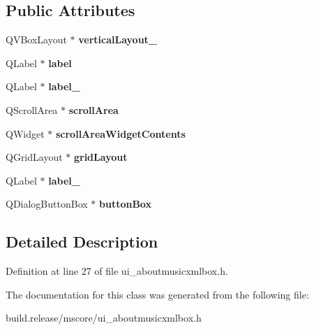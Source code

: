 \subsection*{Public Attributes}
\begin{DoxyCompactItemize}
\item 
\mbox{\label{class_ui___about_music_x_m_l_box_a650afe17b9766b7e45d92c96d412a197}} 
Q\+V\+Box\+Layout $\ast$ {\bfseries vertical\+Layout\+\_}
\item 
\mbox{\label{class_ui___about_music_x_m_l_box_a831104b85672b1934ec876605ca965ea}} 
Q\+Label $\ast$ {\bfseries label}
\item 
\mbox{\label{class_ui___about_music_x_m_l_box_ad11ce0ebb7d0b122afe2c965315f62eb}} 
Q\+Label $\ast$ {\bfseries label\+\_}
\item 
\mbox{\label{class_ui___about_music_x_m_l_box_a45b3d403115a8ee5a88ad6a76b777827}} 
Q\+Scroll\+Area $\ast$ {\bfseries scroll\+Area}
\item 
\mbox{\label{class_ui___about_music_x_m_l_box_ab85446c79b2b364ac0b59ca1158cce77}} 
Q\+Widget $\ast$ {\bfseries scroll\+Area\+Widget\+Contents}
\item 
\mbox{\label{class_ui___about_music_x_m_l_box_a5a03f6f478b1aeaeeaa1022d2ecb38b0}} 
Q\+Grid\+Layout $\ast$ {\bfseries grid\+Layout}
\item 
\mbox{\label{class_ui___about_music_x_m_l_box_ae46d5c1d830edcf7abe200e0134b9dcf}} 
Q\+Label $\ast$ {\bfseries label\+\_}
\item 
\mbox{\label{class_ui___about_music_x_m_l_box_a4f8fa29375b4f7be9c77744e96fdc4be}} 
Q\+Dialog\+Button\+Box $\ast$ {\bfseries button\+Box}
\end{DoxyCompactItemize}


\subsection{Detailed Description}


Definition at line 27 of file ui\+\_\+aboutmusicxmlbox.\+h.



The documentation for this class was generated from the following file\+:\begin{DoxyCompactItemize}
\item 
build.\+release/mscore/ui\+\_\+aboutmusicxmlbox.\+h\end{DoxyCompactItemize}
